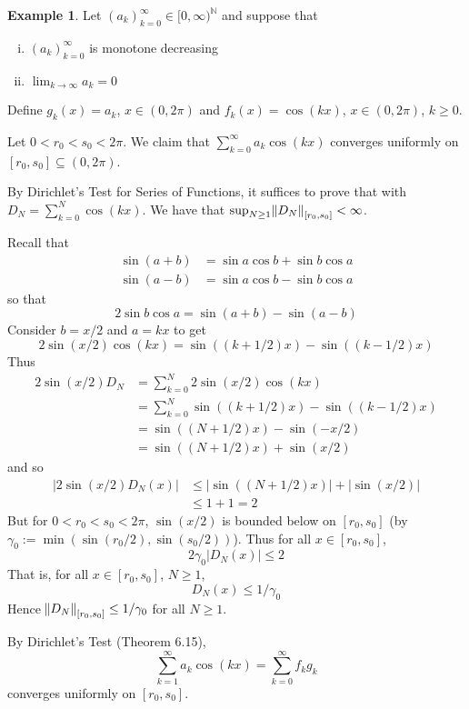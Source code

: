 \documentclass[11pt]{article}
\theoremstyle{definition}
\newtheorem{exmp}[thm]{Example}
\newcommand{\mbN}{\ensuremath{\mathbb{N}}}
\begin{document}
\begin{exmp}
Let $(a_k)_{k=0}^\infty \in [0, \infty)^\mbN$ and suppose that
\begin{enumerate}[(i)] \vspace{-0.2cm}
\item $(a_k)_{k=0}^\infty$ is monotone decreasing
\item $\lim_{k\to\infty} a_k = 0$
\end{enumerate}
Define $g_k(x) = a_k$, $x \in (0, 2\pi)$ and $f_k(x) = \cos(kx)$, $x \in (0, 2\pi)$, $k \geq 0$. 

Let $0 < r_0 < s_0 < 2\pi$. We claim that $\sum_{k=0}^\infty a_k \cos(kx)$ converges uniformly on $[r_0, s_0] \subseteq (0, 2\pi)$.

By Dirichlet's Test for Series of Functions, it suffices to prove that with $D_N = \sum_{k=0}^N \cos(kx)$. 
We have that $\sup_{N \geq 1} \norm{D_N}_{[r_0, s_0]} < \infty$.

Recall that
\begin{align*}
\sin(a+b) & = \sin a \cos b + \sin b \cos a \\
\sin(a-b) & = \sin a \cos b - \sin b \cos a
\end{align*}
so that
$$2\sin b \cos a = \sin(a+b) - \sin(a-b)$$
Consider $b = x/2$ and $a = kx$ to get
$$2\sin(x/2)\cos(kx) = \sin\left((k+1/2)x\right) - \sin\left((k-1/2)x\right)$$
Thus
\begin{align*}
2\sin(x/2)D_N & = \sum_{k=0}^N 2\sin(x/2)\cos(kx) \\
& = \sum_{k=0}^N \sin\left((k+1/2)x\right) - \sin\left((k-1/2)x\right) \\
& = \sin\left((N+1/2)x\right) - \sin(-x/2) \\
& = \sin\left((N+1/2)x\right) + \sin(x/2)
\end{align*}
and so
\begin{align*}
|2\sin(x/2)D_N(x)| & \leq |\sin\left((N+1/2)x\right)| + |\sin(x/2)| \\
& \leq 1+1 = 2
\end{align*}
But for $0 < r_0 < s_0 < 2\pi$, $\sin(x/2)$ is bounded below on $[r_0, s_0]$ (by $\gamma_0 := \min\left(\sin(r_0 / 2), \sin(s_0 / 2)\right)$). Thus for all $x \in [r_0, s_0]$,
$$2\gamma_0 |D_N(x)| \leq 2$$
That is, for all $x \in [r_0, s_0]$, $N \geq 1$,
$$D_N(x) \leq 1/\gamma_0$$
Hence $\norm{D_N}_{[r_0, s_0]} \leq 1/\gamma_0$ for all $N \geq 1$.

By Dirichlet's Test (Theorem 6.15),
$$\sum_{k=1}^\infty a_k \cos(kx) = \sum_{k=0}^\infty f_k g_k$$
converges uniformly on $[r_0, s_0]$.
\end{exmp}
\end{document}
